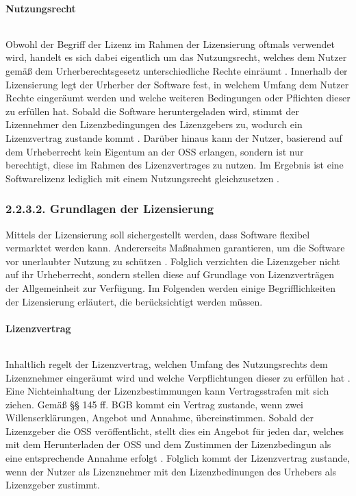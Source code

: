 \paragraph{Nutzungsrecht} $~$

Obwohl der Begriff der Lizenz im Rahmen der Lizensierung oftmals verwendet wird, handelt es sich dabei eigentlich um das Nutzungsrecht, welches dem Nutzer gemäß dem Urherberechtsgesetz unterschiedliche Rechte einräumt \cite[S. 25]{groll_1x1_2021} \cite{wilmer_rechtliche_2021}. Innerhalb der Lizensierung legt der Urherber der Software fest, in welchem Umfang dem Nutzer Rechte eingeräumt werden und welche weiteren Bedingungen oder Pflichten dieser zu erfüllen hat. Sobald die Software heruntergeladen wird, stimmt der Lizennehmer den Lizenzbedingungen des Lizenzgebers zu, wodurch ein Lizenzvertrag zustande kommt \cite{wilmer_rechtliche_2021}. Darüber hinaus kann der Nutzer, basierend auf dem Urheberrecht kein Eigentum an der OSS erlangen, sondern ist nur berechtigt, diese im Rahmen des Lizenzvertrages zu nutzen. Im Ergebnis ist eine Softwarelizenz lediglich mit einem Nutzungsrecht gleichzusetzen \cite[S. 29]{kees_open_2015}.

\subsubsection{2.2.3.2. Grundlagen der Lizensierung}

Mittels der Lizensierung soll sichergestellt werden, dass Software flexibel vermarktet werden kann. Andererseits Maßnahmen garantieren, um die Software vor unerlaubter Nutzung zu schützen \cite[S. 29]{schaaf_open-source-lizenzen_2013}. Folglich verzichten die Lizenzgeber nicht auf ihr Urheberrecht, sondern stellen diese auf Grundlage von Lizenzverträgen der Allgemeinheit zur Verfügung. Im Folgenden werden einige Begrifflichkeiten der Lizensierung erläutert, die berücksichtigt werden müssen.  

\paragraph{Lizenzvertrag} $~$

Inhaltlich regelt der Lizenzvertrag, welchen Umfang des Nutzungsrechts dem Lizenznehmer eingeräumt wird und welche Verpflichtungen dieser zu erfüllen hat \cite[S. 41]{groll_1x1_2021}. Eine Nichteinhaltung der Lizenzbestimmungen kann Vertragsstrafen mit sich ziehen. Gemäß §§ 145 ff. BGB kommt ein Vertrag zustande, wenn zwei Willenserklärungen, Angebot und Annahme, übereinstimmen. Sobald der Lizenzgeber die OSS veröffentlicht, stellt dies ein Angebot für jeden dar, welches mit dem Herunterladen der OSS und dem Zustimmen der Lizenzbedingun als eine entsprechende Annahme erfolgt \cite[S. 29]{schaaf_open-source-lizenzen_2013}. Folglich kommt der Lizenzvertrag zustande, wenn der Nutzer als Lizenznehmer mit den Lizenzbedinungen des Urhebers als Lizenzgeber zustimmt.

